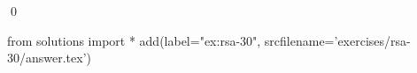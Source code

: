 
\begin{ex} 
  \label{ex:rsa-30}
  
  \qed
\end{ex} 
\begin{python0}
from solutions import *
add(label="ex:rsa-30",
    srcfilename='exercises/rsa-30/answer.tex') 
\end{python0}
